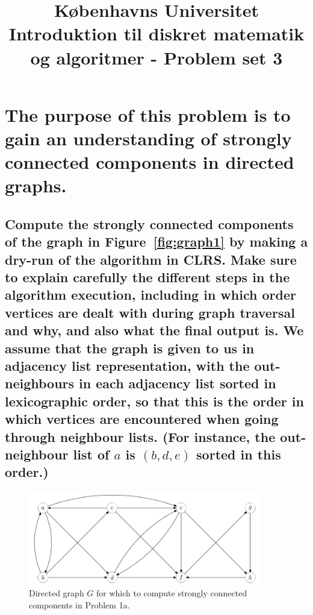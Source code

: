 \documentclass[a4paper,12pt]{article}
\begin{document}
% 

\title{Københavns Universitet\\
Introduktion til diskret matematik og algoritmer - Problem set 3}
\maketitle %



\section[Question 1]{The purpose of this problem is to gain an understanding of strongly connected components in directed graphs.}

\subsection[]{Compute the strongly connected components of the graph in Figure~\ref{fig:graph1} by making a dry-run of the algorithm in CLRS. Make sure to explain carefully the different steps in the algorithm execution, including in which order vertices are dealt with during graph traversal and why, and also what the final output is. We assume that the graph is given to us in adjacency list representation, with the out-neighbours in each adjacency list sorted in lexicographic order, so that this is the order in which vertices are encountered when going through neighbour lists. (For instance, the out-neighbour list of $a$ is $(b, d, e)$ sorted in this order.)}
\begin{figure}[H]
    \centering
    \includegraphics[width=0.9\textwidth]{1.png}
    \caption{Directed graph $G$ for which to compute strongly connected components in Problem 1a.}
\end{figure}
\end{document}

